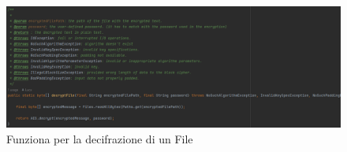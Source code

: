 \begin{figure}[H]
	\centering
	\includegraphics[width=1\textwidth, height=1\textheight, keepaspectratio]{./images/code/java/decryptFile.PNG}
	\caption{Funziona per la decifrazione di un File}
	\label{fig:decryptFile}
\end{figure}


